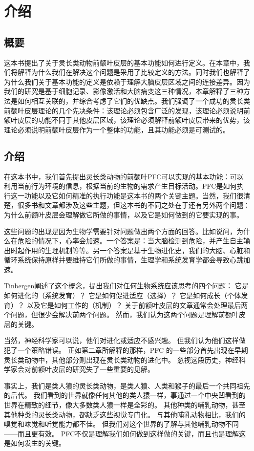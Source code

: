 

\chapter{介绍} \label{chap:chap1}

\section{概要}
这本书提出了关于灵长类动物前额叶皮层的基本功能如何进行定义。在本章中，我们将解释为什么我们在解决这个问题是采用了比较定义的方法。同时我们也解释了为什么我们关于基本功能的定义是依赖于理解大脑皮层区域之间的连接差异。因为我们的研究是基于细胞记录、影像激活和大脑病变这三种情况，本章解释了三种方法是如何相互关联的，并综合考虑了它们的优缺点。我们强调了一个成功的灵长类前额叶皮层理论的几个先决条件：该理论必须包含广泛的发现，该理论必须说明前额叶皮层的功能不同于其他皮层区域，该理论必须解释前额叶皮层带来的优势，该理论必须说明前额叶皮层作为一个整体的功能，且其功能必须是可测试的。

\section{介绍}
在这本书中，我们首先提出灵长类动物的前额叶PFC可以实现的基本功能：可以利用当前行为环境的信息，根据当前的生物的需求产生目标活动。PFC是如何执行这一功能以及它如何精准的执行功能是这本书的两个关键主题。当然，我们很清楚，很多书和文章都涉及这些主题，但这本书的不同之处在于还有另外两个问题：为什么前额叶皮层会理解做它所做的事情，以及它是如何做到的它要实现的事。
\par 
这些问题的出现是因为生物学需要针对问题做出两个方面的回答。比如说问，为什么在危险的情况下，心率会加速。一个答案是：当大脑检测到危险，并产生自主输出时起作用的生理机制等等。另一个答案是基于生物进化史，我们的大脑、心脏和循环系统保持原样并要维持它们所做的事情，生理学和系统发育学都会导致心跳加速。
\par 
Tinbergen阐述了这个概念\cite{tinbergen2020study}，提出我们对任何生物系统应该思考的四个问题：
它是如何进化的（系统发育）？
它是如何促进适应（选择）？
它是如何成长（个体发育）？
以及它是如何工作的（机制）？
关于前额叶皮层的文章通常会处理最后两个问题，但很少会解决前两个问题。
然而，我们认为这两个问题是理解前额叶皮层的关键。
\par 
当然，神经科学家可以说，他们对进化或适应不感兴趣。
但我们认为他们这样做犯了一个策略错误。
正如第二章所解释的那样，PFC 的一些部分首先出现在早期灵长类动物中，其他部分则出现在灵长类动物的进化中。
忽视这段历史，神经科学家会对前额叶皮层的研究失了一些重要的见解。
\par 
事实上，我们是类人猿的灵长类动物，是类人猿、人类和猴子的最后一个共同祖先的后代。
我们看到的世界就像任何其他的类人猿一样，事通过一个中央凹看到的世界在精致的细节，像大多数类人猿一样是全彩的。
其他种类的哺乳动物，甚至其他种类的灵长类动物，都缺乏这些视觉专门化。
与其他哺乳动物相比，我们的嗅觉和味觉和听觉能力都不佳。
但我们对这个世界的了解与其他哺乳动物不同——而且更有效。
PFC不仅是理解我们如何做到这样做的关键，而且也是理解这是如何发生的关键。

